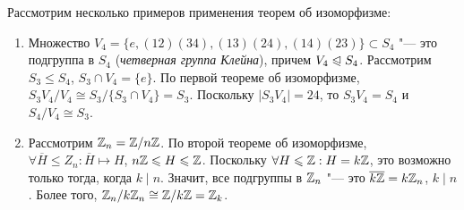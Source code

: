 \begin{example} Рассмотрим несколько примеров применения теорем об изоморфизме:
	\begin{enumerate}
		\item Множество $V_4 = \{e, (12)(34), (13)(24), (14)(23)\} \subset S_4$ "--- это подгруппа в $S_4$ (\textit{четверная группа Клейна}), причем $V_4 \trianglelefteqslant S_4$. Рассмотрим $S_3 \le S_4$, $S_3 \cap V_4 = \{e\}$. По первой теореме об изоморфизме, $S_3V_4 / V_4 \cong S_3 / \{S_3 \cap V_4\} = S_3$. Поскольку $|S_3V_4| = 24$, то $S_3V_4 = S_4$ и $S_4 / V_4 \cong S_3$.
		\item Рассмотрим $\mathbb{Z}_n = \mathbb{Z} / n\mathbb{Z}$. По второй теореме об изоморфизме, $\forall \overline{H} \le Z_n: \overline{H} \mapsto H$, $n\mathbb{Z} \leqslant H \leqslant \mathbb{Z}$. Поскольку $\forall H \leqslant \mathbb{Z}: H = k\mathbb{Z}$, это возможно только тогда, когда $k\mid n$. Значит, все подгруппы в $\mathbb{Z}_n$ "--- это $\overline{k\Z} \hm= k\Z_n$, $k\mid n$. Более того, $\mathbb{Z}_n / k\mathbb{Z}_n \cong \mathbb{Z} / k\mathbb{Z} = \mathbb{Z}_k$.
	\end{enumerate}
\end{example}